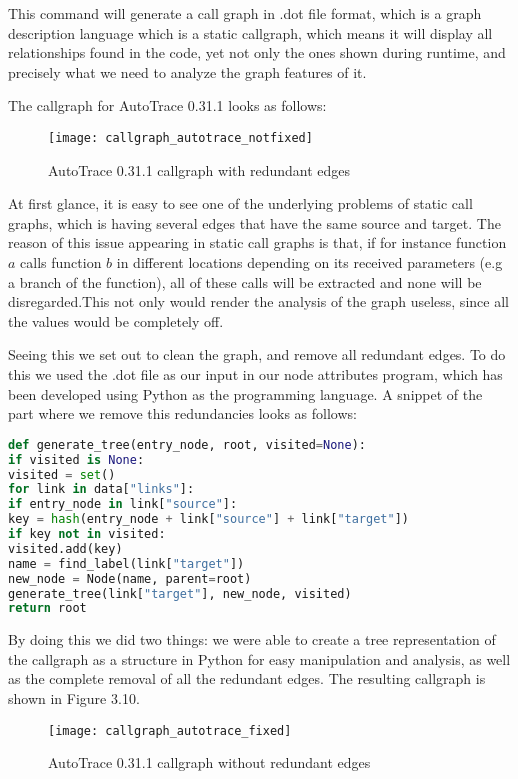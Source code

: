 This command will generate a call graph in .dot file format, which is a graph description language \parencite{dot} which is a static callgraph, which means it will display all relationships found in the code, yet not only the ones shown during runtime, and precisely what we need to analyze the graph features of it.

The callgraph for AutoTrace 0.31.1 looks as follows:

\begin{figure}[!htb]
	\caption{AutoTrace 0.31.1 callgraph with redundant edges}
	\centering
	\texttt{[image: callgraph\_autotrace\_notfixed]}
\end{figure}

At first glance, it is easy to see one of the underlying problems of static call graphs, which is having several edges that have the same source and target. The reason of this issue appearing in static call graphs is that, if for instance function $a$ calls function $b$ in different locations depending on its received parameters (e.g a branch of the function), all of these calls will be extracted and none will be disregarded.This not only would render the analysis of the graph useless, since all the values would be completely off.

Seeing this we set out to clean the graph, and remove all redundant edges. To do this we used the .dot file as our input in our node attributes program, which has been developed using Python as the programming language. A snippet of the part where we remove this redundancies looks as follows:

\begin{lstlisting}[language=python]
def generate_tree(entry_node, root, visited=None):
if visited is None:
visited = set()
for link in data["links"]:
if entry_node in link["source"]:
key = hash(entry_node + link["source"] + link["target"])
if key not in visited:
visited.add(key)
name = find_label(link["target"])
new_node = Node(name, parent=root)
generate_tree(link["target"], new_node, visited)
return root
\end{lstlisting}

By doing this we did two things: we were able to create a tree representation of the callgraph as a structure in Python for easy manipulation and analysis, as well as the complete removal of all the redundant edges. The resulting callgraph is shown in Figure 3.10.

\begin{figure}[!htb]
	\caption{AutoTrace 0.31.1 callgraph without redundant edges}
	\centering
	\texttt{[image: callgraph\_autotrace\_fixed]}
\end{figure}

